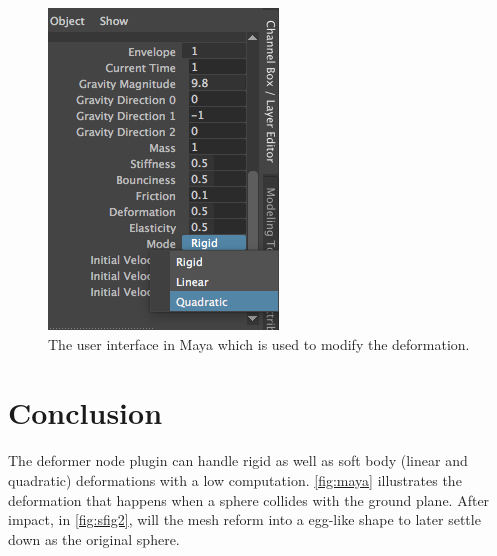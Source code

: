  \begin{figure}[t]
    \includegraphics[width=\linewidth]{img/gui.png}
    \caption{The user interface in Maya which is used to modify the deformation.}
    \label{fig:gui}
    \end{figure}

\section{Conclusion}

The deformer node plugin can handle rigid as well as soft body (linear and quadratic) deformations with a low computation. \ref{fig:maya} illustrates the deformation that happens when a sphere collides with the ground plane. After impact, in \ref{fig:sfig2}, will the mesh reform into a egg-like shape to later settle down as the original sphere.

